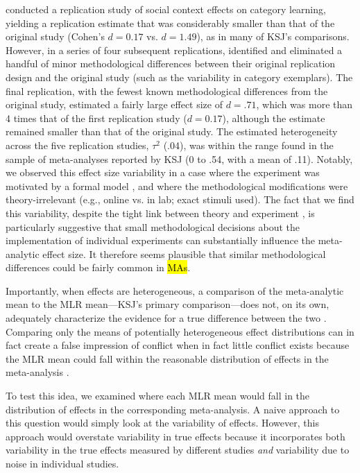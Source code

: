 \documentclass[man,floatsintext]{apa7}
\begin{document}
\Textcite{lewis2016understanding} conducted a replication study of social context effects on category learning, yielding a replication estimate that was considerably smaller than that of the original study (Cohen's $d=0.17$ vs. $d=1.49$), as in many of KSJ's comparisons. However, in a series of four subsequent replications, \Textcite{lewis2016understanding} identified and eliminated a handful of minor methodological differences between their original replication design and the original study (such as the variability in category exemplars). The final replication, with the fewest known methodological differences from the original study, estimated a fairly large effect size of $d=.71$, which was more than 4 times that of the first replication study ($d=0.17$), although the estimate remained smaller than that of the original study. The estimated heterogeneity across the five replication studies,  $\tau^{2}$ (.04), was within the range found in the sample of meta-analyses reported by KSJ (0 to .54, with a mean of .11). Notably, we observed this effect size variability in a case where the experiment was motivated by a formal model \parencite{xu2007word}, and where the methodological modifications were theory-irrelevant (e.g., online vs. in lab; exact stimuli used). The fact that we find this variability, despite the tight link between theory and experiment \parencite{oberauer2019addressing}, is particularly suggestive that small methodological decisions about the implementation of individual experiments can substantially influence the meta-analytic effect size. It therefore seems plausible that similar methodological differences could be fairly common in \hl{MAs}. 

Importantly, when effects are heterogeneous, a comparison of the meta-analytic mean to the MLR mean---KSJ’s primary comparison---does not, on its own, adequately characterize the evidence for a true difference between the two \parencite{mathur2019new}. Comparing only the means of potentially heterogeneous effect distributions can in fact create a false impression of conflict when in fact little conflict exists because the MLR mean could fall within the reasonable distribution of effects in the meta-analysis \parencite{mathur2019new, mathur2019finding}. 

To test this idea, we examined where each MLR mean would fall in the distribution of effects in the corresponding meta-analysis. A naive approach to this question would simply look at the variability of effects. However, this approach would overstate  variability in true effects because it incorporates both variability in the true effects measured by different studies \emph{and} variability due to noise in individual studies.
\end{document}

